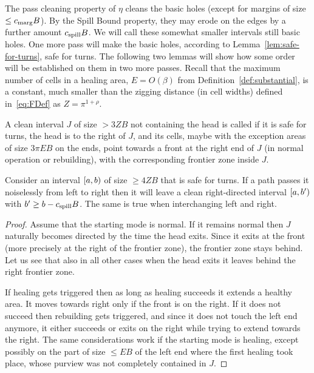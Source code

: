 \documentclass[11pt]{memoir}
\theoremstyle{definition} %
\renewcommand{\le}{\leq}
\renewcommand{\ge}{\geq}
\def\B{B}
\newcommand{\E}{E} %
\newcommand{\passno}{\pi}
\newcommand{\Z}{Z} %
\newcommand{\cns}[1]{c_{\textrm{\upshape #1}}}
\newcommand{\CMarg}{\cns{marg}}
\newcommand{\CSpill}{\cns{spill}}
\begin{document}
The pass cleaning property of \( \eta \) cleans the basic holes (except for margins of size \( \le\CMarg\B \)).
By the Spill Bound property, they may erode on the edges by a further amount \( \CSpill\B \).
We will call these somewhat smaller intervals still basic holes.
One more pass will make the basic holes, according to Lemma~\ref{lem:safe-for-turns}, safe for turns.
The following two lemmas will show how some order will be established on them in two more passes.
Recall that the maximum number of cells in a healing area, \( \E  = O(\beta) \)
from Definition~\ref{def:substantial}, is a constant, much smaller than the zigging distance (in cell widths)
defined in~\eqref{eq:FDef} as \( \Z=\passno^{1+\rho} \).

\begin{definition}\label{def:directed}
A clean interval \( J \) of size \( >3\Z\B \) not containing the head is called 
if it is safe for turns, the head is to the right of \( J \),
and its cells, maybe with the exception areas of size \( 3\passno\E\B \) on the ends,
point towards a front at the right end of \( J \) (in normal operation or rebuilding),
with the corresponding frontier zone inside \( J \).
\end{definition}

\begin{lemma}\label{lem:make-directed}
  Consider an interval \( \left[a,b\right) \) of size \( \ge 4\Z\B \) that is safe for turns.
  If a path passes it noiselessly
  from left to right then it will leave a clean right-directed interval \( \left[a,b'\right) \) with 
  \( b'\ge b-\CSpill\B \).
  The same is true when interchanging left and right.
\end{lemma}
\begin{proof}
  Assume that the starting mode is normal.
  If it remains normal then \( J \) naturally becomes directed by the time the head exits.
  Since it exits at the front (more precisely at the right of the frontier zone),
  the frontier zone stays behind.
  Let us see that also in all other cases when the head exits it leaves behind the
  right frontier zone.
  
  If healing gets triggered then as long as healing succeeds it extends a healthy area.
  It moves towards right only if the front is on the right.
  If it does not succeed then rebuilding gets triggered,
  and since it does not touch the left end anymore, it either succeeds or exits on the right
  while trying to extend towards the right.
 The same considerations work if the starting mode is healing, except possibly on
 the part of size \( \le\E\B \) of the left end where the first healing took place, whose purview
 was not completely contained in \( J \).
\end{proof}
\end{document}
